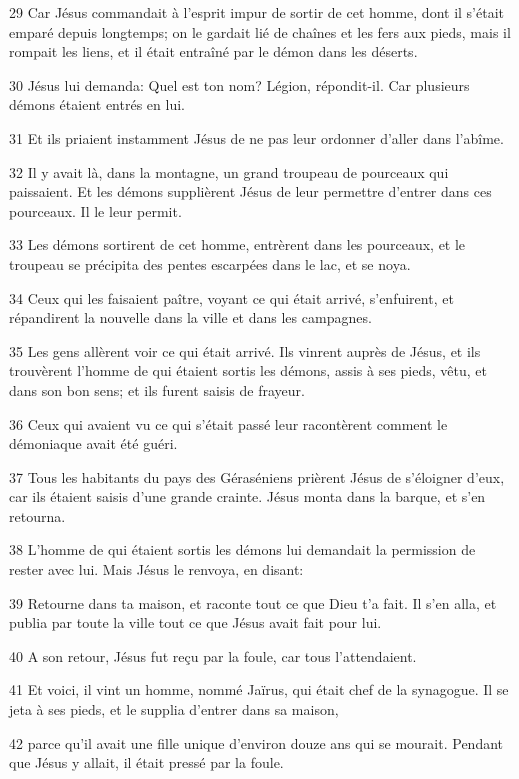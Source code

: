 \par 29 Car Jésus commandait à l'esprit impur de sortir de cet homme, dont il s'était emparé depuis longtemps; on le gardait lié de chaînes et les fers aux pieds, mais il rompait les liens, et il était entraîné par le démon dans les déserts.
\par 30 Jésus lui demanda: Quel est ton nom? Légion, répondit-il. Car plusieurs démons étaient entrés en lui.
\par 31 Et ils priaient instamment Jésus de ne pas leur ordonner d'aller dans l'abîme.
\par 32 Il y avait là, dans la montagne, un grand troupeau de pourceaux qui paissaient. Et les démons supplièrent Jésus de leur permettre d'entrer dans ces pourceaux. Il le leur permit.
\par 33 Les démons sortirent de cet homme, entrèrent dans les pourceaux, et le troupeau se précipita des pentes escarpées dans le lac, et se noya.
\par 34 Ceux qui les faisaient paître, voyant ce qui était arrivé, s'enfuirent, et répandirent la nouvelle dans la ville et dans les campagnes.
\par 35 Les gens allèrent voir ce qui était arrivé. Ils vinrent auprès de Jésus, et ils trouvèrent l'homme de qui étaient sortis les démons, assis à ses pieds, vêtu, et dans son bon sens; et ils furent saisis de frayeur.
\par 36 Ceux qui avaient vu ce qui s'était passé leur racontèrent comment le démoniaque avait été guéri.
\par 37 Tous les habitants du pays des Géraséniens prièrent Jésus de s'éloigner d'eux, car ils étaient saisis d'une grande crainte. Jésus monta dans la barque, et s'en retourna.
\par 38 L'homme de qui étaient sortis les démons lui demandait la permission de rester avec lui. Mais Jésus le renvoya, en disant:
\par 39 Retourne dans ta maison, et raconte tout ce que Dieu t'a fait. Il s'en alla, et publia par toute la ville tout ce que Jésus avait fait pour lui.
\par 40 A son retour, Jésus fut reçu par la foule, car tous l'attendaient.
\par 41 Et voici, il vint un homme, nommé Jaïrus, qui était chef de la synagogue. Il se jeta à ses pieds, et le supplia d'entrer dans sa maison,
\par 42 parce qu'il avait une fille unique d'environ douze ans qui se mourait. Pendant que Jésus y allait, il était pressé par la foule.
